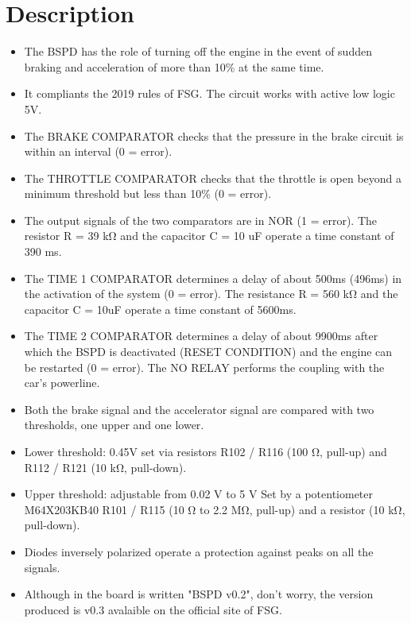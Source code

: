 \documentclass[a4paper,12pt,oneside,pdflatex,italian,final,twocolumn]{article}
\begin{document}
\section{Description}
\begin{itemize}
    
\item  The BSPD has the role of turning off the engine in the event of sudden braking and
acceleration of more than 10\% at the same time.
\item  It compliants the 2019 rules of FSG.
The circuit works with active low logic 5V.
\item  The BRAKE COMPARATOR checks that the pressure in the brake circuit is within an interval
(0 = error).
\item  The THROTTLE COMPARATOR checks that the throttle is open beyond a minimum
threshold but less than 10\% (0 = error).
\item The output signals of the two comparators are in NOR (1 = error).
The resistor R = 39 k\si{\ohm} and the capacitor C = 10 uF operate a time constant of 390 ms.
\item  The TIME 1 COMPARATOR determines a delay of about 500ms (496ms) in the activation of the system (0 = error).
The resistance R = 560 k\si{\ohm} and the capacitor C = 10uF operate a time constant of 5600ms.
\item  The TIME 2 COMPARATOR determines a delay of about 9900ms after which the BSPD is
deactivated (RESET CONDITION) and the engine can be restarted (0 = error).
The NO RELAY performs the coupling with the car's powerline.
\item Both the brake signal and the accelerator signal are compared with two
thresholds, one upper and one lower.
\item Lower threshold: 0.45V set via resistors R102 / R116 (100 \si{\ohm}, pull-up) and R112 / R121 (10 k\si{\ohm}, pull-down).
\item Upper threshold: adjustable from 0.02 V to 5 V Set by a potentiometer M64X203KB40 R101 / R115 (10 \si{\ohm} to 2.2 M\si{\ohm}, pull-up) and a resistor (10 k\si{\ohm}, pull-down).
\item  Diodes inversely polarized operate a protection against peaks on all the signals.
\item  Although in the board is written "BSPD v0.2", don't worry, the version produced is v0.3 avalaible on the official site of FSG.
\end{itemize}
\end{document}
